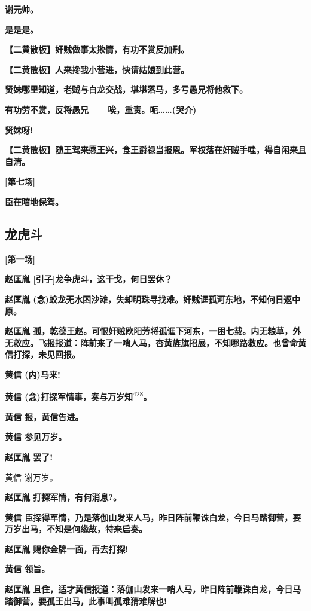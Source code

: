 \textbf{谢元帅。}

\textbf{是是是。}

\textbf{【二黄散板】奸贼做事太欺情，有功不赏反加刑。}

\textbf{【二黄散板】人来搀我小营进，快请姑娘到此营。}

\textbf{贤妹哪里知道，老贼与白龙交战，堪堪落马，多亏愚兄将他救下。}

\textbf{有功劳不赏，反将愚兄------唉，重责。呃\ldots{}\ldots{}(哭介)}

\textbf{贤妹呀!}

\textbf{【二黄散板】随王驾来愿王兴，食王爵禄当报恩。军权落在奸贼手哇，得自闲来且自清。}

\textbf{{[}第七场{]}}

\textbf{臣在暗地保驾。}

\newpage
\hypertarget{ux9f99ux864eux6597}{%
\subsection{龙虎斗}\label{ux9f99ux864eux6597}}

\textbf{{[}第一场{]}}

\textbf{赵匡胤 {[}引子{]}龙争虎斗，这干戈，何日罢休？}

\textbf{赵匡胤
(念)蛟龙无水困沙滩，失却明珠寻找难。奸贼诓孤河东地，不知何日返中原。}

\textbf{赵匡胤
孤，乾德王赵。可恨奸贼欧阳芳将孤诓下河东，一困七载。内无粮草，外无救应。飞报报道：阵前来了一哨人马，杏黄旌旗招展，不知哪路救应。也曾命黄信打探，未见回报。}

\textbf{黄信 (内)马来!}

\textbf{黄信
(念)打探军情事，奏与万岁知}\protect\hyperlink{fn428}{\textsuperscript{428}}\textbf{。}

\textbf{黄信 报，黄信告进。}

\textbf{黄信 参见万岁。}

\textbf{赵匡胤 罢了!}

黄信 谢万岁。

\textbf{赵匡胤 打探军情，有何消息?。}

\textbf{黄信
臣探得军情，乃是落伽山发来人马，昨日阵前鞭诛白龙，今日马踏御营，要万岁出马，不知是何缘故，特来启奏。}

\textbf{赵匡胤 赐你金牌一面，再去打探!}

\textbf{黄信 领旨。}

\textbf{赵匡胤
且住，适才黄信报道：落伽山发来一哨人马，昨日阵前鞭诛白龙，今日马踏御营。要孤王出马，此事叫孤难猜难解也!}

